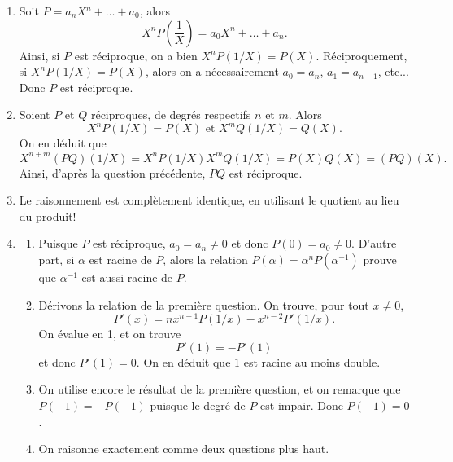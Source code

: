 \documentclass[11pt,a4paper]{article}
\begin{document}
	\begin{corrige}
		\begin{enumerate}
			
			\item  Soit $P=a_nX^n+\dots+a_0$, alors
			$$X^n P\left(\frac 1X\right)=a_0X^n+\dots+a_n.$$
			Ainsi, si $P$ est réciproque, on a bien $X^n P(1/X)=P(X)$. Réciproquement, si $X^nP(1/X)=P(X)$, alors on a nécessairement
			$a_0=a_n$, $a_1=a_{n-1}$, etc... Donc $P$ est réciproque.
			
			\item  Soient $P$ et $Q$ réciproques, de degrés respectifs $n$ et $m$. Alors 
			$$X^n P(1/X)=P(X)\textrm{ et }X^m Q(1/X)=Q(X).$$
			On en déduit que 
			$$X^{n+m}(PQ)(1/X)=X^n P(1/X)X^m Q(1/X)=P(X)Q(X)=(PQ)(X).$$
			Ainsi, d'après la question précédente, $PQ$ est réciproque.
			
			\item  Le raisonnement est complètement identique, en utilisant le quotient au lieu du produit!
			
			\item  
			
			\begin{enumerate}
				
				\item  Puisque $P$ est réciproque, $a_0=a_n\neq 0$ et donc $P(0)=a_0\neq 0$. D'autre part, si $\alpha$ est racine de $P$, alors la relation
				$P(\alpha)=\alpha^n P(\alpha^{-1})$ prouve que $\alpha^{-1}$ est aussi racine de $P$.
				
				\item  Dérivons la relation de la première question. On trouve, pour tout $x\neq 0$, 
				$$P'(x)=nx^{n-1}P(1/x)-x^{n-2}P'(1/x).$$
				On évalue en 1, et on trouve
				$$P'(1)=-P'(1)$$ et donc $P'(1)=0$. 
				On en déduit que $1$ est racine au moins double.
				
				\item  On utilise encore le résultat de la première question, et on remarque que $P(-1)=-P(-1)$ puisque le degré
				de $P$ est impair. Donc $P(-1)=0$. 
				
				\item  On raisonne exactement comme deux questions plus haut.
				
			\end{enumerate}
			

\end{enumerate}
\end{corrige}
\end{document}
